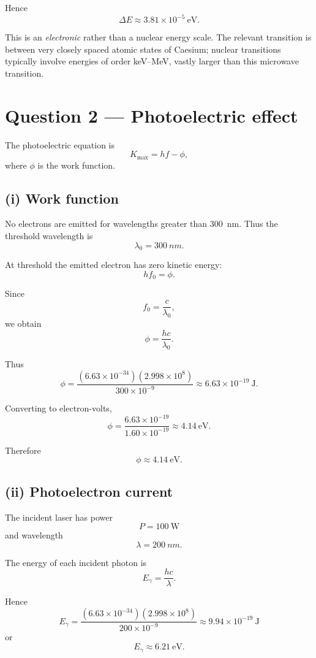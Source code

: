 \documentclass[11pt,a4paper]{article}
\begin{document}
Hence
\[
\boxed{\Delta E\approx3.81\times10^{-5}\ \mathrm{eV}}.
\]

This is an \emph{electronic} rather than a nuclear energy scale. The relevant
transition is between very closely spaced atomic states of Caesium; nuclear
transitions typically involve energies of order keV--MeV, vastly larger than this
microwave transition.

\section{Question 2 --- Photoelectric effect}

The photoelectric equation is
\[
K_{\max}=hf-\phi,
\]
where $\phi$ is the work function.

\subsection{(i) Work function}

No electrons are emitted for wavelengths greater than \SI{300}{nm}. Thus the
threshold wavelength is
\[
\lambda_0=\SI{300}{nm}.
\]

At threshold the emitted electron has zero kinetic energy:
\[
hf_0=\phi.
\]

Since
\[
f_0=\frac{c}{\lambda_0},
\]
we obtain
\[
\phi=\frac{hc}{\lambda_0}.
\]

Thus
\[
\phi
=
\frac{(6.63\times10^{-34})(2.998\times10^8)}
{300\times10^{-9}}
\approx6.63\times10^{-19}\ \mathrm J.
\]

Converting to electron-volts,
\[
\phi
=
\frac{6.63\times10^{-19}}
{1.60\times10^{-19}}
\approx4.14\ \mathrm{eV}.
\]

Therefore
\[
\boxed{\phi\approx4.14\ \mathrm{eV}}.
\]

\subsection{(ii) Photoelectron current}

The incident laser has power
\[
P=100\ \mathrm W
\]
and wavelength
\[
\lambda=\SI{200}{nm}.
\]

The energy of each incident photon is
\[
E_\gamma=\frac{hc}{\lambda}.
\]

Hence
\[
E_\gamma
=
\frac{(6.63\times10^{-34})(2.998\times10^8)}
{200\times10^{-9}}
\approx9.94\times10^{-19}\ \mathrm J
\]
or
\[
E_\gamma\approx6.21\ \mathrm{eV}.
\]
\end{document}

